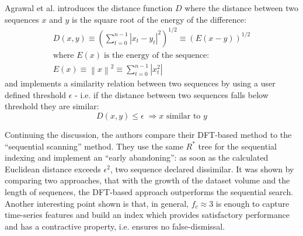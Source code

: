 Agrawal et al. introduces the distance function $D$ where the distance between two sequences $x$ and $y$ is the square root of the energy of the difference:
\begin{align}
D(x,y) \equiv \left( \sum_{t=0}^{n-1} \left| x_{t} - y_{t} \right| ^{2} \right) ^{1/2}
       \equiv \left( E(x-y) \right) ^{1/2} \\
\text{where } E(x) \; \text{is the energy of the sequence:} \nonumber \\
E(x) \equiv \left\| x \right\| ^{2} \equiv \sum_{t=0}^{n-1} \left| x_{t} ^{2} \right|
\label{eq:dft_distance}
\end{align}
and implements a similarity relation between two sequences by using a user defined threshold $\epsilon$ - i.e. if the distance between two sequences falls below threshold they are similar:
\begin{equation}
D(x,y) \leq \epsilon \; \Rightarrow \text{$x$ similar to $y$}
\label{eq:dft_similarity_dft}
\end{equation}

Continuing the discussion, the authors compare their DFT-based method to the ``sequential scanning'' method. They use the same $R^{*}$ tree for the sequential indexing and implement an ``early abandoning'': as soon as the calculated Euclidean distance exceeds $\epsilon^{2}$, two sequence declared dissimilar. It was shown by comparing two approaches, that with the growth of the dataset volume and the length of sequences, the DFT-based approach outperforms the sequential search. Another interesting point shown is that, in general, $f_{c} \approx 3$ is enough to capture time-series features and build an index which provides satisfactory performance and has a contractive property, i.e. ensures no false-dismissal.
